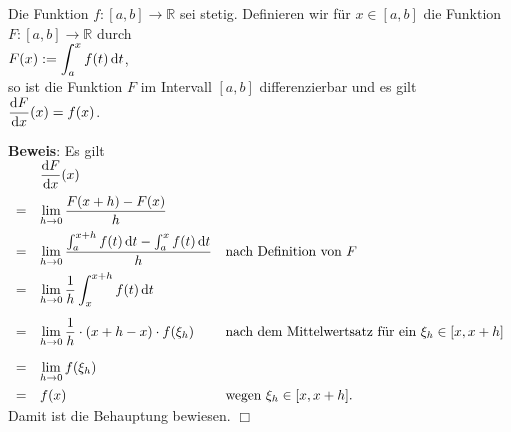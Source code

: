 \begin{Satz} \lb
  \label{satz:ableitungInt}
  Die Funktion $f:[a,b] \rightarrow \mathbb{R}$ sei stetig.  Definieren wir f\"ur 
  $x \in [a,b]$ die Funktion  $F:[a,b] \rightarrow \mathbb{R}$ durch 
  \\[0.2cm]
  \hspace*{1.3cm}
  $\displaystyle F(x) := \int_a^x f(t)\, \textrm{d} t$,
  \\[0.2cm]
  so ist die Funktion $F$ im Intervall $[a,b]$ differenzierbar und es gilt 
  \\[0.2cm]
  \hspace*{1.3cm} $\displaystyle\frac{\textrm{d}F}{\textrm{d}x}(x) = f(x)$.
\end{Satz}

\noindent
\textbf{Beweis}: Es gilt
\\[0.3cm]
\hspace*{1.3cm}
$
\begin{array}[t]{cll}  

   &\ds \df F(x) \\[0.3cm]
 = &\ds  \lim\limits_{h\rightarrow 0} \frac{F(x+h) - F(x)}{h} \\[0.3cm]
 = &\ds \lim\limits_{h\rightarrow 0} \ds\frac{\int_a^{x+h} f(t)\, \dr t - \int_a^x f(t)\, \dr t}{h} &
      \mbox{nach Definition von $F$} \\[0.3cm]
 = &\ds \lim\limits_{h\rightarrow 0} \ds\frac{1}{h}\int_{x}^{x+h} f(t)\, \dr t \\[0.5cm]
 = &\ds \lim\limits_{h\rightarrow 0} \ds\frac{1}{h} \cdot  (x+h - x) \cdot   f(\xi_h) &
      \mbox{nach dem Mittelwertsatz f\"ur ein $\xi_h\in[x, x+h]$} \\[0.5cm]
 = &\ds \lim\limits_{h\rightarrow 0} \ds f(\xi_h) \\[0.3cm]
 = & \ds f(x) & \mbox{wegen $\xi_h \in [x, x+h]$}.
\end{array}
$
\\[0.3cm]
Damit ist die Behauptung bewiesen. \hspace*{\fill} $\Box$

